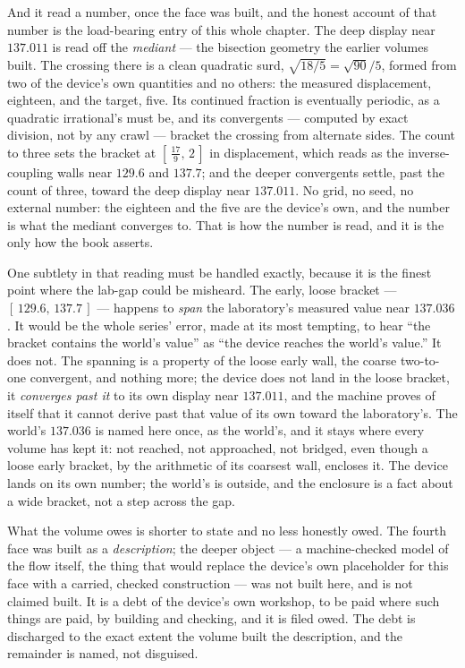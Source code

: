 And it read a number, once the face was built, and the honest account of that
number is the load-bearing entry of this whole chapter. The deep display near
$137.011$ is read off the \emph{mediant} --- the bisection geometry the earlier
volumes built. The crossing there is a clean quadratic surd, $\sqrt{18/5} =
\sqrt{90}/5$, formed from two of the device's own quantities and no others: the
measured displacement, eighteen, and the target, five. Its continued fraction is
eventually periodic, as a quadratic irrational's must be, and its convergents ---
computed by exact division, not by any crawl --- bracket the crossing from
alternate sides. The count to three sets the bracket at $\left[\,\tfrac{17}{9},\,
2\,\right]$ in displacement, which reads as the inverse-coupling walls near
$129.6$ and $137.7$; and the deeper convergents settle, past the count of three,
toward the deep display near $137.011$. No grid, no seed, no external number: the
eighteen and the five are the device's own, and the number is what the mediant
converges to. That is how the number is read, and it is the only how the book
asserts.

One subtlety in that reading must be handled exactly, because it is the finest
point where the lab-gap could be misheard. The early, loose bracket ---
$\left[\,129.6,\, 137.7\,\right]$ --- happens to \emph{span} the laboratory's
measured value near $137.036$. It would be the whole series' error, made at its
most tempting, to hear ``the bracket contains the world's value'' as ``the device
reaches the world's value.'' It does not. The spanning is a property of the loose
early wall, the coarse two-to-one convergent, and nothing more; the device does
not land in the loose bracket, it \emph{converges past it} to its own display near
$137.011$, and the machine proves of itself that it cannot derive past that value
of its own toward the laboratory's. The world's $137.036$ is named here once, as
the world's, and it stays where every volume has kept it: not reached, not
approached, not bridged, even though a loose early bracket, by the arithmetic of
its coarsest wall, encloses it. The device lands on its own number; the world's
is outside, and the enclosure is a fact about a wide bracket, not a step across
the gap.

What the volume owes is shorter to state and no less honestly owed. The fourth
face was built as a \emph{description}; the deeper object --- a machine-checked
model of the flow itself, the thing that would replace the device's own
placeholder for this face with a carried, checked construction --- was not built
here, and is not claimed built. It is a debt of the device's own workshop, to be
paid where such things are paid, by building and checking, and it is filed owed.
The debt is discharged to the exact extent the volume built the description, and
the remainder is named, not disguised.

